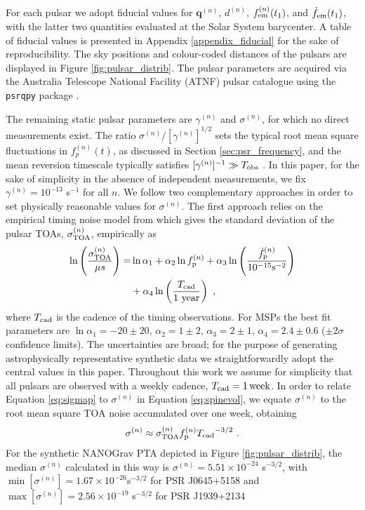 \documentclass[fleqn,usenatbib,useAMS]{mnras}
\begin{document}
For each pulsar we adopt fiducial values for ${\boldsymbol{q}}^{(n)}$, $d^{(n)}$, $f_{\rm em}^{(n)}(t_1)$, and $\dot{f}_{\rm em}(t_1)$, with the latter two quantities evaluated at the Solar System barycenter. A table of fiducial values is presented in Appendix \ref{appendix_fiducial} for the sake of reproducibility. The sky positions and colour-coded distances of the pulsars are displayed in Figure \ref{fig:pulsar_distrib}. The pulsar parameters are acquired via the Australia Telescope National Facility (ATNF) pulsar catalogue \citep{Manchester2005} using the \texttt{psrqpy} package \citep{psrqpy}. \newline 

The remaining static pulsar parameters are $\gamma^{(n)}$ and $\sigma^{(n)}$, for which no direct measurements exist. The ratio $\sigma^{(n)} / [\gamma^{(n)}]^{1/2}$ sets the typical root mean square fluctuations in $f_p^{(n)}(t)$, as discussed in Section \ref{sec:psr_frequency}, and the mean reversion timescale typically satisfies $[\gamma^{(n)}]^{-1} \gg T_{\rm obs}$ \citep{Price2012,Myers2021MNRAS.502.3113M,Meyers2021,Vargas}. In this paper, for the sake of simplicity in the absence of independent measurements, we fix $\gamma^{(n)} = 10^{-13}$ s$^{-1}$ for all $n$. We follow two complementary approaches in order to  set physically reasonable values for $\sigma^{(n)}$. The first approach relies on the empirical timing noise model from \cite{Shannon2010ApJ...725.1607S} which gives the standard deviation of the pulsar TOAs, $\sigma_{\rm TOA}^{(n)}$, empirically as
\begin{align}
	\ln \left(\frac{\sigma_{\rm TOA}^{(n)}}{\mu s} \right)=& \ln \alpha_1 +  \alpha_2 \ln f_{\rm p}^{(n)} + \alpha_3 \ln \left(\frac{\dot{f}_{\rm p}^{(n)}}{10^{-15} \text{s}^{-2}} \right) \nonumber \\ 
	&+ \alpha_4 \ln \left( \frac{T_{\rm cad}}{ 1 \text{ year}} \right) \ , \label{eq:sigmap}
\end{align}
where $T_{\rm cad}$ is the cadence of the timing observations. For MSPs the best fit parameters are $\ln \alpha_1 = -20 \pm 20$, $\alpha_2 = 1 \pm 2 $, $\alpha_3 = 2 \pm 1$, $\alpha_4 = 2.4 \pm 0.6$ ($\pm 2\sigma$ confidence limits). The uncertainties are broad; for the purpose of generating astrophysically representative synthetic data we straightforwardly adopt the central values in this paper. Throughout this work we assume for simplicity that all pulsars are observed with a weekly cadence, $T_{\rm cad} = 1 \,{\rm week}$. In order to relate Equation \eqref{eq:sigmap} to $\sigma^{(n)}$ in Equation \eqref{eq:spinevol}, we equate $\sigma^{(n)}$ to the root mean square TOA noise accumulated over one week, obtaining
\begin{eqnarray}
	\sigma^{(n)} \approx \sigma_{\rm TOA}^{(n)} f_{\rm p}^{(n)} {T_{\rm cad}}^{-3/2} \ . \label{eq:sigmap_f}
\end{eqnarray}
For the synthetic NANOGrav PTA depicted in Figure \ref{fig:pulsar_distrib}, the median $\sigma^{(n)}$ calculated in this way is $\sigma^{(n)} = 5.51 \times 10^{-24} $ s$^{-3/2}$, with $\min [ \sigma^{(n)} ] = 1.67 \times 10^{-26}$s$^{-3/2}$ for PSR J0645+5158 and $\max [ \sigma^{(n)} ] = 2.56 \times 10^{-19}$ s$^{-3/2}$ for PSR J1939+2134 \newline 
\end{document}
